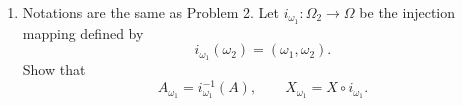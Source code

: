 \documentclass[letterpaper, 12pt]{article}
\begin{document}
\begin{enumerate}
\begin{proof}
Let $A \subset \Omega$.
Suppose $\omega_2 \in A_{\omega_1}$. 
Thus $(\omega_1, \omega_2) \in A$. 
Therefore, $I_{A_{\omega_1}}(\omega_2) = 1$ 
and $(I_A)_{\omega_1}(\omega_2) = I_A(\omega_1, \omega_2) = 1$.
And we see both functions agree. 
Now suppose $\omega_2 \notin A_{\omega_1}$. 
Then $(\omega_1, \omega_2) \notin A$. 
Thus $I_{A_{\omega_1}}(\omega_2) = 0$ 
and $(I_{A})_{\omega_1} (\omega_1) = I_A (\omega_1, \omega_2) = 0$. 
And we conclude $(I_A)_{\omega_1}=I_{A_{\omega_1}}$ for $A\subset\Omega$.

For the second part, note for all $B \subset \Psi$
\begin{align*}
(X^{-1}(B))_{\omega_1} 
&= \{\omega_2 \in \Omega_2 : (\omega_1, \omega_2) \in X^{-1}(B)\} \\
&= \{\omega_2 \in \Omega_2 : X(\omega_1, \omega_2) \in B\} \\
&= \{\omega_2 \in \Omega_2 : X_{\omega_1}(\omega_2) \in B\} \\
&= (X_{\omega_1})^{-1}(B) \\
&= X_{\omega_1}^{-1}(B)
\end{align*}
as desired.
\end{proof}
\item
Notations are the same as Problem 2. 
Let $i_{\omega_1}:\Omega_2\to\Omega$ be the injection mapping defined by
\[
i_{\omega_1}(\omega_2) = (\omega_1,\omega_2).
\]
Show that
\[
A_{\omega_1} = i_{\omega_1}^{-1}(A),
\qquad 
X_{\omega_1} = X \circ i_{\omega_1}.
\]


\end{enumerate}
\end{document}
